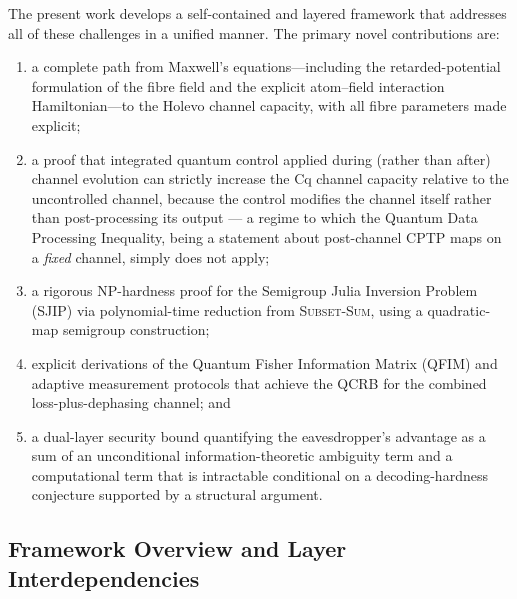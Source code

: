 \documentclass[journal,twocolumn]{IEEEtran}
\theoremstyle{definition}
\theoremstyle{plain}
\begin{document}
The present work develops a self-contained and layered framework
that addresses all of these challenges in a unified manner.
The primary novel contributions are:
\begin{enumerate}[leftmargin=*, label=(\roman*), itemsep=2pt]
  \item a complete path from Maxwell's equations---including the
        retarded-potential formulation of the fibre field and the
        explicit atom--field interaction Hamiltonian---to the Holevo
        channel capacity, with all fibre parameters made explicit;
  \item a proof that integrated quantum control applied during
        (rather than after) channel evolution can strictly increase
        the Cq channel capacity relative to the uncontrolled channel,
        because the control modifies the channel itself rather than
        post-processing its output --- a regime to which the Quantum
        Data Processing Inequality, being a statement about
        post-channel CPTP maps on a \emph{fixed} channel, simply does
        not apply;
  \item a rigorous NP-hardness proof for the Semigroup Julia
        Inversion Problem (SJIP) via polynomial-time reduction from
        \textsc{Subset-Sum}, using a quadratic-map semigroup
        construction;
  \item explicit derivations of the Quantum Fisher Information
        Matrix (QFIM) and adaptive measurement protocols that
        achieve the QCRB for the combined loss-plus-dephasing
        channel; and
  \item a dual-layer security bound quantifying the eavesdropper's
        advantage as a sum of an unconditional information-theoretic
        ambiguity term and a computational term that is intractable
        conditional on a decoding-hardness conjecture supported by a
        structural argument.
\end{enumerate}

\subsection{Framework Overview and Layer Interdependencies}
\label{subsec:overview}
\end{document}
